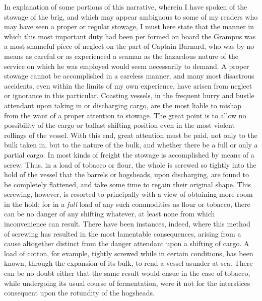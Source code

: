 In explanation of some portions of this narrative, wherein I have spoken of
the stowage of the brig, and which may appear ambiguous to some of my readers
who may have seen a proper or regular stowage, I must here state that the manner
in which this most important duty had been per formed on board the Grampus was a
most shameful piece of neglect on the part of Captain Barnard, who was by no
means as careful or as experienced a seaman as the hazardous nature of the
service on which he was employed would seem necessarily to demand. A proper
stowage cannot be accomplished in a careless manner, and many most disastrous
accidents, even within the limits of my own experience, have arisen from neglect
or ignorance in this particular. Coasting vessels, in the frequent hurry and
bustle attendant upon taking in or discharging cargo, are the most liable to
mishap from the want of a proper attention to stowage. The great point is to
allow no possibility of the cargo or ballast shifting position even in the most
violent rollings of the vessel. With this end, great attention must be paid, not
only to the bulk taken in, but to the nature of the bulk, and whether there be a
full or only a partial cargo. In most kinds of freight the stowage is
accomplished by means of a screw. Thus, in a load of tobacco or flour, the whole
is screwed so tightly into the hold of the vessel that the barrels or hogsheads,
upon discharging, are found to be completely flattened, and take some time to
regain their original shape. This screwing, however, is resorted to principally
with a view of obtaining more room in the hold; for in a \emph{full} load of any
such commodities as flour or tobacco, there can be no danger of any shifting
whatever, at least none from which inconvenience can result. There have been
instances, indeed, where this method of screwing has resulted in the most
lamentable consequences, arising from a cause altogether distinct from the
danger attendant upon a shifting of cargo. A load of cotton, for example,
tightly screwed while in certain conditions, has been known, through the
expansion of its bulk, to rend a vessel asunder at sea. There can be no doubt
either that the same result would ensue in the case of tobacco, while undergoing
its usual course of fermentation, were it not for the interstices consequent
upon the rotundity of the hogsheads. 

